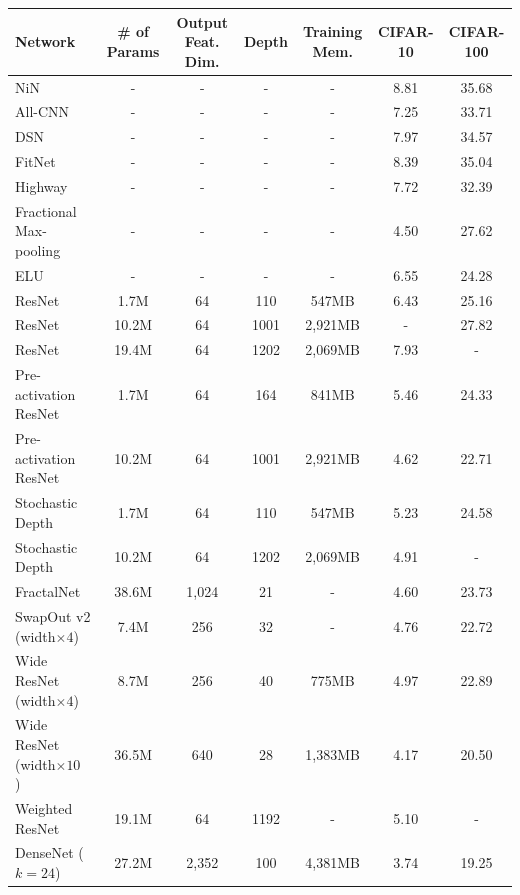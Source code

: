 \documentclass[10pt,twocolumn,letterpaper]{article}
\begin{document}
\begin{table}[t]
\fontsize{9}{10}\selectfont
\begin{center}
\begin{tabular}{|l|c|c|c|c|c|c|}
\hline
Network & \# of Params & Output Feat. Dim. &  Depth & Training Mem. & CIFAR-10 & CIFAR-100 \\
\hline\hline
NiN~\cite{NiN} & - & - & - & - & 8.81& 35.68\\
All-CNN~\cite{allcnn} & - & - & - & - & 7.25& 33.71\\
DSN~\cite{DSN} & - & - & - & - & 7.97 & 34.57 \\
FitNet~\cite{fitnet} & - & - & - & - & 8.39 & 35.04 \\
Highway~\cite{Highway} & - & - & - & - & 7.72 & 32.39 \\
Fractional Max-pooling~\cite{fracc} & - & - & -& - & 4.50 & 27.62 \\
ELU~\cite{Highway} & - & - & - & - & 6.55 & 24.28 \\
\hline
ResNet~\cite{resnet} & 1.7M & 64 & 110 & 547MB & 6.43& 25.16\\
ResNet~\cite{resnet} & 10.2M & 64 & 1001 & 2,921MB & - & 27.82\\
ResNet~\cite{resnet} & 19.4M & 64 & 1202 & 2,069MB & 7.93& -\\
\hline
Pre-activation ResNet~\cite{preresnet} & 1.7M & 64 & 164 & 841MB & 5.46& 24.33\\
Pre-activation ResNet~\cite{preresnet} & 10.2M & 64 & 1001 & 2,921MB & 4.62& 22.71\\
\hline
Stochastic Depth~\cite{stochasticdepth} & 1.7M & 64 &  110 & 547MB & 5.23& 24.58\\
Stochastic Depth~\cite{stochasticdepth} & 10.2M & 64 & 1202 & 2,069MB & 4.91& -\\
\hline
FractalNet~\cite{fractalnet} & 38.6M & 1,024 & 21 & - & 4.60& 23.73\\
\hline
SwapOut v2 (width$\times4$)~\cite{swapout} & 7.4M & 256 & 32 & - & 4.76& 22.72\\
\hline
Wide ResNet (width$\times4$)~\cite{wideresnet} & 8.7M & 256 & 40 & 775MB & 4.97& 22.89\\
Wide ResNet (width$\times10$)~\cite{wideresnet} & 36.5M & 640 & 28 & 1,383MB & 4.17& 20.50\\
\hline
Weighted ResNet~\cite{weightedresnet} & 19.1M & 64 & 1192 & - & 5.10& -\\
\hline
DenseNet ($k=24$)~\cite{densenet} & 27.2M & 2,352 & 100 & 4,381MB & 3.74 & 19.25 \\

\end{tabular}
\end{center}
\end{table}
\end{document}
